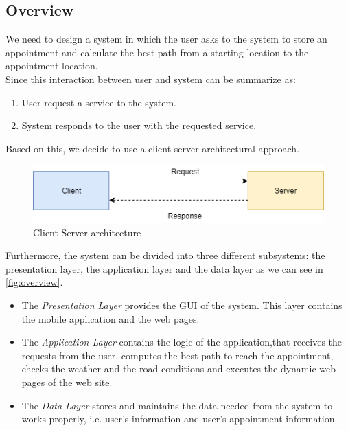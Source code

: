 \subsection{Overview}
We need to design a system in which the user asks to the system to store an appointment and calculate the best path from a starting location to the appointment location. \\
Since this interaction between user and system can be summarize as:
\begin{enumerate}
	\item User request a service to the system.
	\item System responds to the user with the requested service.
\end{enumerate}
Based on this, we decide to use a client-server architectural approach.
\begin{figure}[H]
	\includegraphics{Img/ClientServerArchitecture}
	\caption{Client Server architecture}
	\label{fig:clientserver}
\end{figure}
Furthermore, the system can be divided into three different subsystems: the presentation layer, the application layer and the data layer as we can see in \autoref{fig:overview}. 
\begin{itemize}
	\item The \emph{Presentation Layer} provides the GUI of the system. This layer contains
	the mobile application and the web pages.
	\item The \emph{Application Layer} contains the logic of the application,that receives the requests from the user, computes the best path to reach the appointment, checks the weather and the road conditions and executes the dynamic web pages of the web site.
	\item The \emph{Data Layer} stores and maintains the data needed from the system to works properly, i.e. user’s information and user’s appointment information.
\end{itemize}
